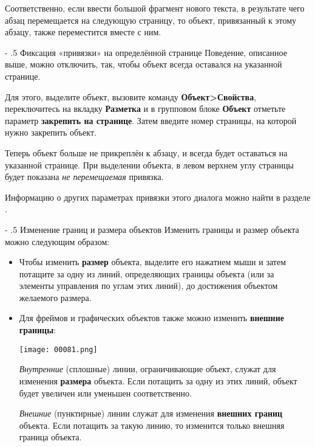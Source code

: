 ﻿\documentclass[a4paper,10pt]{article}
\makeatletter
\renewcommand\paragraph{%
   \@startsection{paragraph}{4}{0mm}%
      {-\baselineskip}%
      {.5\baselineskip}%
      {\normalfont\normalsize\bfseries}}
\makeatother
\begin{document}
Соответственно, если ввести большой фрагмент нового текста, в результате чего абзац перемещается на следующую страницу, то объект, привязанный к этому абзацу, также переместится вместе с ним.

\paragraph{Фиксация «привязки» на определённой странице}
Поведение, описанное выше, можно отключить, так, чтобы объект всегда оставался на указанной странице.

Для этого, выделите объект, вызовите команду \textbf{Объект>Свойства}, переключитесь на вкладку \textbf{Разметка} и в групповом блоке \textbf{Объект} отметьте параметр \textbf{закрепить на странице}. Затем введите номер страницы, на которой  нужно закрепить объект.

Теперь объект больше не прикреплён к абзацу, и всегда будет оставаться на указанной странице. При выделении объекта, в левом верхнем углу страницы будет показана \textit{не перемещаемая} привязка.

Информацию о других параметрах привязки этого диалога можно  найти в разделе .

\paragraph{Изменение границ и размера объектов}
Изменить границы и размер объекта можно следующим образом:
\begin{itemize}
 \item Чтобы изменить \textbf{размер} объекта, выделите его нажатием мыши и затем потащите за одну из линий, определяющих границы объекта (или за элементы управления по углам этих линий), до достижения объектом желаемого размера.
 \item Для фреймов и графических объектов также можно изменить \textbf{внешние границы}:
 
 \texttt{[image: 00081.png]}
 
 \textit{Внутренние} (сплошные) линии, ограничивающие объект, служат для изменения \textbf{размера} объекта. Если потащить за одну из этих линий, объект будет увеличен или уменьшен соответственно.
 
 \textit{Внешние} (пунктирные) линии служат для изменения \textbf{внешних границ} объекта. Если потащить за такую линию, то изменится только внешняя граница объекта.
\end{itemize}
\end{document}
